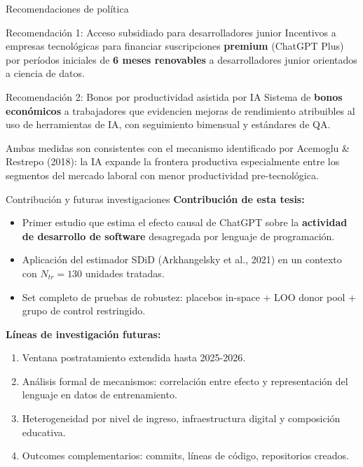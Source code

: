 \documentclass[10pt,aspectratio=169]{beamer}
\begin{document}
\begin{frame}{Recomendaciones de política}
\begin{block}{Recomendación 1: Acceso subsidiado para desarrolladores junior}
Incentivos a empresas tecnológicas para financiar suscripciones \textbf{premium} (ChatGPT Plus) por períodos iniciales de \textbf{6 meses renovables} a desarrolladores junior orientados a ciencia de datos.
\end{block}

\begin{block}{Recomendación 2: Bonos por productividad asistida por IA}
Sistema de \textbf{bonos económicos} a trabajadores que evidencien mejoras de rendimiento atribuibles al uso de herramientas de IA, con seguimiento bimensual y estándares de QA.
\end{block}

\vspace{0.5em}
\centering
\small Ambas medidas son consistentes con el mecanismo identificado por Acemoglu \& Restrepo (2018): la IA expande la frontera productiva especialmente entre los segmentos del mercado laboral con menor productividad pre-tecnológica.
\end{frame}

\begin{frame}{Contribución y futuras investigaciones}
\textbf{Contribución de esta tesis:}
\begin{itemize}
  \item Primer estudio que estima el efecto causal de ChatGPT sobre la \textbf{actividad de desarrollo de software} desagregada por lenguaje de programación.
  \item Aplicación del estimador SDiD (Arkhangelsky et al., 2021) en un contexto con $N_{tr} = 130$ unidades tratadas.
  \item Set completo de pruebas de robustez: placebos in-space + LOO donor pool + grupo de control restringido.
\end{itemize}

\vspace{0.5em}
\textbf{Líneas de investigación futuras:}
\begin{enumerate}
  \item Ventana postratamiento extendida hasta 2025-2026.
  \item Análisis formal de mecanismos: correlación entre efecto y representación del lenguaje en datos de entrenamiento.
  \item Heterogeneidad por nivel de ingreso, infraestructura digital y composición educativa.
  \item Outcomes complementarios: commits, líneas de código, repositorios creados.
\end{enumerate}
\end{frame}
\end{document}
